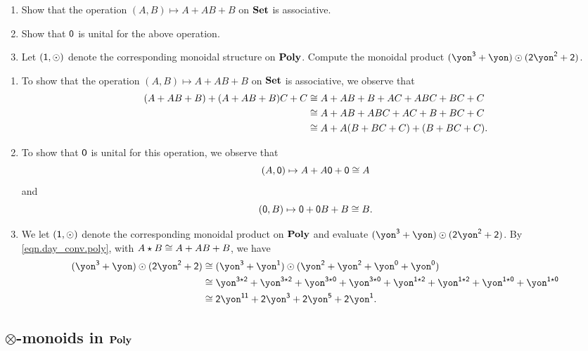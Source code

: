 \documentclass[Book-Poly]{subfiles}
\begin{document}
\begin{exercise}
\begin{enumerate}
	\item Show that the operation $(A, B)\mapsto A+AB+B$ on $\mathbf{Set}$ is associative.
	\item Show that $\textsf{0}$ is unital for the above operation.
	\item Let $(\textsf{1},\odot)$ denote the corresponding monoidal structure on $\mathbf{Poly}$. Compute the monoidal product $(\yon^\3+\yon)\odot(\2\yon^\2+\2)$.
\qedhere
\end{enumerate}
\begin{solution}
\begin{enumerate}
    \item To show that the operation $(A, B)\mapsto A+AB+B$ on $\mathbf{Set}$ is associative, we observe that
    \begin{align*}
        (A + AB + B) + (A + AB + B)C + C &\cong A + AB + B + AC + ABC + BC + C \\
        &\cong A + AB + ABC + AC + B + BC + C \\
        &\cong A + A(B + BC + C) + (B + BC + C).
    \end{align*}
    \item To show that $\textsf{0}$ is unital for this operation, we observe that
    \[
        (A, \textsf{0}) \mapsto A + A\textsf{0} + \textsf{0} \cong A
    \]
    and
    \[
        (\textsf{0}, B) \mapsto \textsf{0} + \textsf{0}B + B \cong B.
    \]
    \item We let $(\textsf{1},\odot)$ denote the corresponding monoidal product on $\mathbf{Poly}$ and evaluate $(\yon^\3+\yon)\odot(\2\yon^\2+\2)$.
    By \eqref{eqn.day_conv.poly}, with $A \star B \cong A + AB + B$, we have
    \begin{align*}
        (\yon^\3+\yon)\odot(\2\yon^\2+\2) &\iso (\yon^\3+\yon^\1)\odot(\yon^\2+\yon^\2+\yon^\0+\yon^\0) \\
        &\iso \yon^{\3\star\2} + \yon^{\3\star\2} + \yon^{\3\star\0} + \yon^{\3\star\0} + \yon^{\1\star\2} + \yon^{\1\star\2} + \yon^{\1\star\0} + \yon^{\1\star\0} \\
        &\iso \2\yon^{\1\1} + \2\yon^\3 + \2\yon^\5 + \2\yon^\1.
    \end{align*}
\end{enumerate}
\end{solution}
\end{exercise}

\subsection{$\otimes$-monoids in $\mathbf{Poly}$} \label{subsec.poly.func_nat.prepare_dyn.par_monoid}
\end{document}
